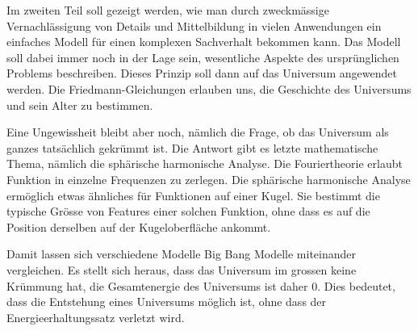 Im zweiten Teil soll gezeigt werden, wie man durch zweckmässige
Vernachlässigung von Details und Mittelbildung in vielen Anwendungen
ein einfaches Modell für einen komplexen Sachverhalt bekommen kann.
Das Modell soll dabei immer noch in der Lage sein, wesentliche
Aspekte des ursprünglichen Problems beschreiben.
Dieses Prinzip soll dann auf das Universum angewendet werden.
Die Friedmann-Gleichungen erlauben uns, die Geschichte des
Universums und sein Alter zu bestimmen.

Eine Ungewissheit bleibt aber noch, nämlich die Frage, ob das
Universum als ganzes tatsächlich gekrümmt ist.
Die Antwort gibt es letzte mathematische Thema, nämlich die
sphärische harmonische Analyse.
Die Fouriertheorie erlaubt Funktion in einzelne Frequenzen zu
zerlegen.
Die sphärische harmonische Analyse ermöglich etwas ähnliches
für Funktionen auf einer Kugel. 
Sie bestimmt die typische Grösse von Features einer solchen
Funktion, ohne dass es auf die Position derselben auf der Kugeloberfläche
ankommt.

Damit lassen sich verschiedene Modelle Big Bang Modelle miteinander
vergleichen.
Es stellt sich heraus, dass das Universum im grossen keine Krümmung hat,
die Gesamtenergie des Universums ist daher $0$.
Dies bedeutet, dass die Entstehung eines Universums möglich ist,
ohne dass der Energieerhaltungssatz verletzt wird.




